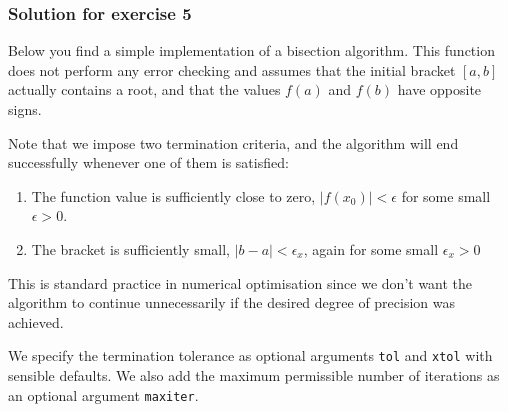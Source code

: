 \documentclass[10pt]{scrartcl}
\providecommand{\tightlist}{%
      \setlength{\itemsep}{0pt}\setlength{\parskip}{0pt}}
\begin{document}
    \hypertarget{solution-for-exercise-5}{%
\subsubsection{Solution for exercise 5}\label{solution-for-exercise-5}}

    Below you find a simple implementation of a bisection algorithm. This
function does not perform any error checking and assumes that the
initial bracket \([a,b]\) actually contains a root, and that the values
\(f(a)\) and \(f(b)\) have opposite signs.

Note that we impose two termination criteria, and the algorithm will end
successfully whenever one of them is satisfied:

\begin{enumerate}
\def\labelenumi{\arabic{enumi}.}
\tightlist
\item
  The function value is sufficiently close to zero,
  \ie \(|f(x_0)| < \epsilon\) for some small \(\epsilon > 0\).
\item
  The bracket is sufficiently small, \ie \(|b-a| < \epsilon_x\), again
  for some small \(\epsilon_x > 0\)
\end{enumerate}

This is standard practice in numerical optimisation since we don't want
the algorithm to continue unnecessarily if the desired degree of
precision was achieved.

We specify the termination tolerance as optional arguments \texttt{tol}
and \texttt{xtol} with sensible defaults. We also add the maximum
permissible number of iterations as an optional argument
\texttt{maxiter}.
\end{document}
